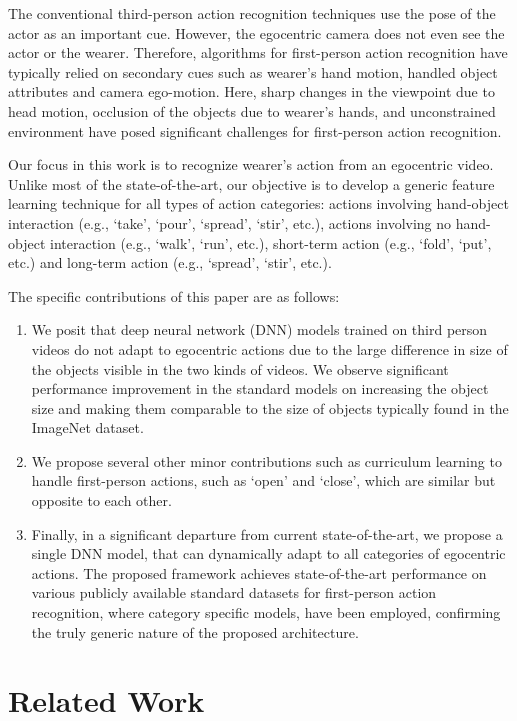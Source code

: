\documentclass{article}
\begin{document}
The conventional third-person action recognition techniques use the pose of the actor as an important cue. However, the egocentric camera does not even see the actor or the wearer. Therefore, algorithms for first-person action recognition have typically relied on secondary cues such as wearer's hand motion, handled object attributes and camera ego-motion. Here, sharp changes in the viewpoint due to head motion, occlusion of the objects due to wearer's hands, and unconstrained environment have posed significant challenges for first-person action recognition.

Our focus in this work is to recognize wearer's action from an egocentric video. Unlike most of the state-of-the-art, our objective is to develop a generic feature learning technique for all types of action categories: actions involving hand-object interaction (e.g., \lq{take}\rq, \lq{pour}\rq, \lq{spread}\rq, \lq{stir}\rq, etc.), actions involving no hand-object interaction (e.g., \lq{walk}\rq, \lq{run}\rq, etc.), short-term action (e.g., \lq{fold}\rq, \lq{put}\rq, etc.) and long-term action (e.g., \lq{spread}\rq, \lq{stir}\rq, etc.).



The specific contributions of this paper are as follows:
\begin{enumerate}
\item We posit that deep neural network (DNN) models trained on third person videos do not adapt to egocentric actions due to the large difference in size of the objects visible in the two kinds of videos. We observe significant performance improvement in the standard models on increasing the object size and making them comparable to the size of objects typically found in the ImageNet dataset.
\item We propose several other minor contributions such as curriculum learning to handle first-person actions, such as `open' and `close', which are similar but opposite to each other.
\item Finally, in a significant departure from current state-of-the-art, we propose a single DNN model, that can dynamically adapt to all categories of egocentric actions. The proposed framework achieves state-of-the-art performance on various publicly available standard datasets for first-person action recognition, where category specific models, have been employed, confirming the truly generic nature of the proposed architecture.
\end{enumerate}

\section{Related Work}
\label{sec:format}
\end{document}
